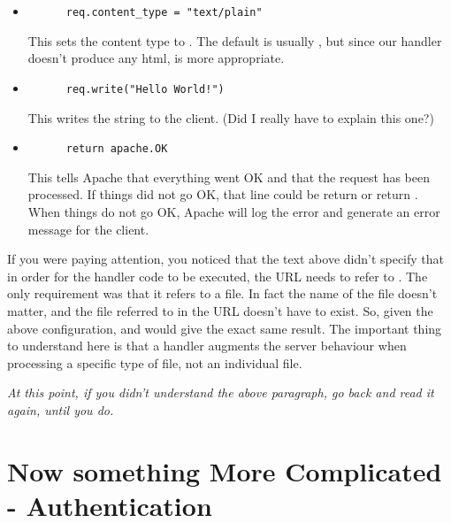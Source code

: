 \begin{enumerate}
\begin{itemize}
  \item
    \begin{verbatim}
      req.content_type = "text/plain"
    \end{verbatim}

    This sets the content type to . The default is usually
    , but since our handler doesn't produce any html,
     is more appropriate.

  \item
    \begin{verbatim}
      req.write("Hello World!")
    \end{verbatim}

    This writes the  string to the client. (Did I really
    have to explain this one?)

  \item
    \begin{verbatim}
      return apache.OK
    \end{verbatim}

    This tells Apache that everything went OK and that the request has
    been processed. If things did not go OK, that line could be return
     or return
    . When things do not go OK, Apache
    will log the error and generate an error message for the client.
  \end{itemize}
\end{enumerate}

 If you were paying attention, you
noticed that the text above didn't specify that in order for the
handler code to be executed, the URL needs to refer to
. The only requirement was that it refers to a
 file. In fact the name of the file doesn't matter, and
the file referred to in the URL doesn't have to exist. So, given the
above configuration,  and
 would give the exact
same result. The important thing to understand here is that a handler
augments the server behaviour when processing a specific type of file,
not an individual file.

\emph{At this point, if you didn't understand the above paragraph, go
  back and read it again, until you do.}

\section{Now something More Complicated - Authentication\label{tut-more-complicated}}

